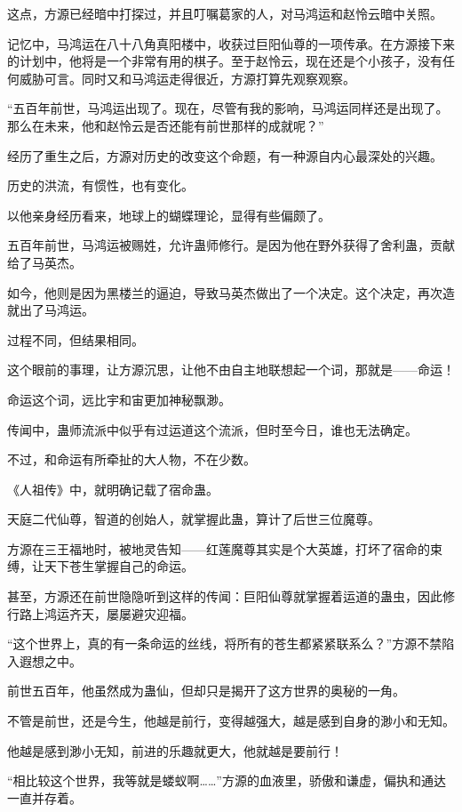 \begin{this_body}
这点，方源已经暗中打探过，并且叮嘱葛家的人，对马鸿运和赵怜云暗中关照。

记忆中，马鸿运在八十八角真阳楼中，收获过巨阳仙尊的一项传承。在方源接下来的计划中，他将是一个非常有用的棋子。至于赵怜云，现在还是个小孩子，没有任何威胁可言。同时又和马鸿运走得很近，方源打算先观察观察。

“五百年前世，马鸿运出现了。现在，尽管有我的影响，马鸿运同样还是出现了。那么在未来，他和赵怜云是否还能有前世那样的成就呢？”

经历了重生之后，方源对历史的改变这个命题，有一种源自内心最深处的兴趣。

历史的洪流，有惯性，也有变化。

以他亲身经历看来，地球上的蝴蝶理论，显得有些偏颇了。

五百年前世，马鸿运被赐姓，允许蛊师修行。是因为他在野外获得了舍利蛊，贡献给了马英杰。

如今，他则是因为黑楼兰的逼迫，导致马英杰做出了一个决定。这个决定，再次造就出了马鸿运。

过程不同，但结果相同。

这个眼前的事理，让方源沉思，让他不由自主地联想起一个词，那就是——命运！

命运这个词，远比宇和宙更加神秘飘渺。

传闻中，蛊师流派中似乎有过运道这个流派，但时至今日，谁也无法确定。

不过，和命运有所牵扯的大人物，不在少数。

《人祖传》中，就明确记载了宿命蛊。

天庭二代仙尊，智道的创始人，就掌握此蛊，算计了后世三位魔尊。

方源在三王福地时，被地灵告知——红莲魔尊其实是个大英雄，打坏了宿命的束缚，让天下苍生掌握自己的命运。

甚至，方源还在前世隐隐听到这样的传闻：巨阳仙尊就掌握着运道的蛊虫，因此修行路上鸿运齐天，屡屡避灾迎福。

“这个世界上，真的有一条命运的丝线，将所有的苍生都紧紧联系么？”方源不禁陷入遐想之中。

前世五百年，他虽然成为蛊仙，但却只是揭开了这方世界的奥秘的一角。

不管是前世，还是今生，他越是前行，变得越强大，越是感到自身的渺小和无知。

他越是感到渺小无知，前进的乐趣就更大，他就越是要前行！

“相比较这个世界，我等就是蝼蚁啊……”方源的血液里，骄傲和谦虚，偏执和通达一直并存着。


\end{this_body}
